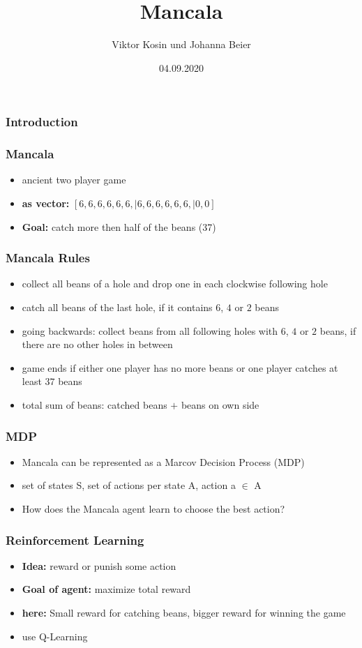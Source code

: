\documentclass{beamer}
\title{Mancala}
\author{Viktor Kosin und Johanna Beier}
\date{04.09.2020}
\begin{document}
\frame{\titlepage}

\begin{frame}
\frametitle{Introduction}
\end{frame}

\begin{frame}
\frametitle{Mancala}
\begin{itemize}
\item ancient two player game
\end{itemize}
\end{frame}

\begin{frame}
\begin{itemize}
\item \textbf{as vector:} $[6,6,6,6,6,6, | 6,6,6,6,6,6, |0,0]$
\item\textbf{Goal:} catch more then half of the beans (37) 
\end{itemize}
\end{frame}

\begin{frame}
\frametitle{Mancala Rules}
\begin{itemize}
\item collect all beans of a hole and drop one in each clockwise following hole
\item catch all beans of the last hole, if it contains $6$, $4$ or $2$ beans
\item going backwards: collect beans from all following holes with $6$, $4$ or $2$ beans, if there are no other holes in between
\item game ends if either one player has no more beans or one player catches at least $37$ beans
\item total sum of beans: catched beans $+$ beans on own side
\end{itemize}
\end{frame}

\begin{frame}
 \frametitle{MDP}
 \begin{itemize}
 \item Mancala can be represented as a Marcov Decision Process (MDP)
 \item set of states S, set of actions per state A, action a $\in$ A
 \item How does the Mancala agent learn to choose the best action?
 \end{itemize}
 \end{frame}

 \begin{frame}
 \frametitle{Reinforcement Learning}
 \begin{itemize}
 \item \textbf{Idea:} reward or punish some action
 \item \textbf{Goal of agent:} maximize total reward
 \item \textbf{here:} Small reward for catching beans, bigger reward for winning the game
 \item use Q-Learning
 \end{itemize}
 \end{frame}
 
\end{document}
